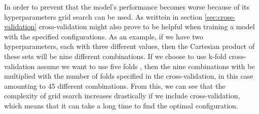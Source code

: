 In order to prevent that the model's performance becomes worse because of its hyperparameters grid search can be used. As writtein in section \ref{sec:cross-validation} cross-validation might also prove to be helpful when training a model with the specified configurations. As an example, if we have two hyperparameters, each with three different values, then the Cartesian product of these sets will be nine different combinations. If we choose to use k-fold cross-validation \textemdash assume we want to use five folds \textemdash, then the nine combinations with be multiplied with the number of folds specified in the cross-validation, in this case amounting to 45 different combinations. From this, we can see that the complexity of grid search increases drastically if we include cross-validation, which means that it can take a long time to find the optimal configuration.











